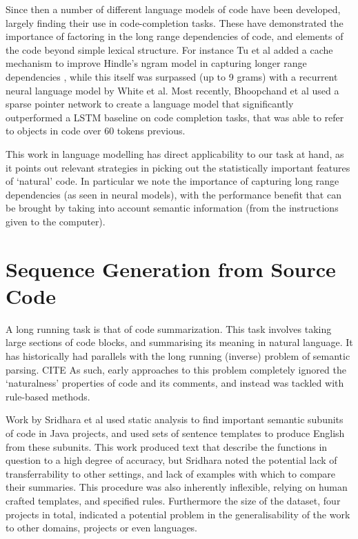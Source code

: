 Since then a number of different language models of code have been developed, largely finding their use in code-completion tasks. These have demonstrated the importance of factoring in the long range dependencies of code, and elements of the code beyond simple lexical structure. For instance Tu et al added a cache mechanism to improve Hindle's ngram model in capturing longer range dependencies  \cite{tu_localness_nodate}, while this itself was surpassed (up to 9 grams) with a recurrent neural language model by White et al\cite{white_toward_2015}.
Most recently, Bhoopchand et al used a sparse pointer network to create a language model that significantly outperformed a LSTM baseline on code completion tasks, that was able to refer to objects in code over 60 tokens previous\cite{bhoopchand_learning_2016}.

This work in language modelling has direct applicability to our task at hand, as it points out relevant strategies in picking out the statistically important features of `natural' code. In particular we note the importance of capturing long range dependencies (as seen in neural models), with the performance benefit that can be brought by taking into account semantic information (from the instructions given to the computer).

\section{Sequence Generation from Source Code}

A long running task is that of code summarization. 
This task involves taking large sections of code blocks, and summarising its meaning in natural language. It has historically had parallels with the long running (inverse) problem of semantic parsing. CITE
As such, early approaches to this problem completely ignored the `naturalness' properties of code and its comments, and instead was tackled with rule-based methods. 

Work by Sridhara et al \cite{sridhara_[not_2010}  used static analysis to find important semantic subunits of code in Java projects, and used sets of sentence templates to produce English from these subunits.
This work produced text that describe the functions in question to a high degree of accuracy, but Sridhara noted the potential lack of transferrability to other settings, and lack of examples with which to compare their summaries.  
This procedure was also inherently inflexible, relying on human crafted templates, and specified rules. Furthermore the size of the dataset, four projects in total, indicated a potential problem in the generalisability of the work to other domains, projects or even languages.

